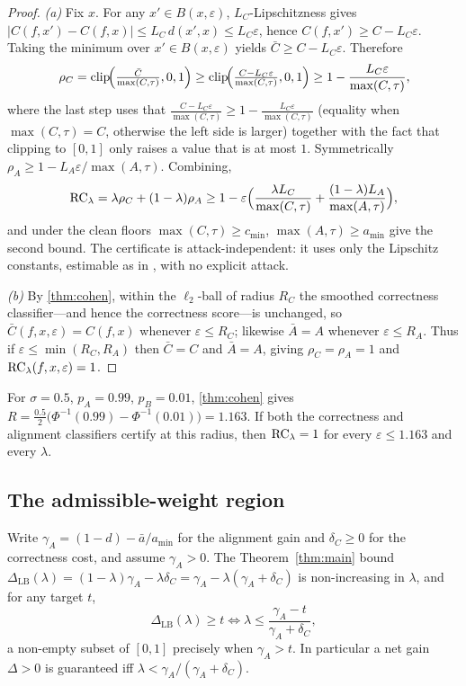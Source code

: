 \begin{proof}
\emph{(a)} Fix $x$. For any $x'\in B(x,\varepsilon)$, $L_C$-Lipschitzness gives
$|C(f,x')-C(f,x)|\le L_C\,d(x',x)\le L_C\varepsilon$, hence $C(f,x')\ge C-L_C
\varepsilon$. Taking the minimum over $x'\in B(x,\varepsilon)$ yields
$\bar C\ge C-L_C\varepsilon$. Therefore
\[
  \rho_C=\mathrm{clip}\!\Big(\tfrac{\bar C}{\max(C,\tau)},0,1\Big)
    \ge\mathrm{clip}\!\Big(\tfrac{C-L_C\varepsilon}{\max(C,\tau)},0,1\Big)
    \ge 1-\frac{L_C\varepsilon}{\max(C,\tau)},
\]
where the last step uses that $\frac{C-L_C\varepsilon}{\max(C,\tau)}\ge
1-\frac{L_C\varepsilon}{\max(C,\tau)}$ (equality when $\max(C,\tau)=C$, otherwise
the left side is larger) together with the fact that clipping to $[0,1]$ only raises
a value that is at most $1$. Symmetrically $\rho_A\ge1-L_A\varepsilon/\max(A,\tau)$.
Combining,
\[
  \mathrm{RC}_\lambda=\lambda\rho_C+(1-\lambda)\rho_A
    \ge 1-\varepsilon\Big(\frac{\lambda L_C}{\max(C,\tau)}
      +\frac{(1-\lambda)L_A}{\max(A,\tau)}\Big),
\]
and under the clean floors $\max(C,\tau)\ge c_{\min}$, $\max(A,\tau)\ge a_{\min}$
give the second bound. The certificate is attack-independent: it uses only the
Lipschitz constants, estimable as in \cite{Weng2018}, with no explicit attack.

\emph{(b)} By \cref{thm:cohen}, within the $\ell_2$-ball of radius $R_C$ the
smoothed correctness classifier---and hence the correctness score---is unchanged, so
$\bar C(f,x,\varepsilon)=C(f,x)$ whenever $\varepsilon\le R_C$; likewise
$\bar A=A$ whenever $\varepsilon\le R_A$. Thus if $\varepsilon\le\min(R_C,R_A)$ then
$\bar C=C$ and $\bar A=A$, giving $\rho_C=\rho_A=1$ and
$\mathrm{RC}_\lambda(f,x,\varepsilon)=1$.
\end{proof}

\begin{example}\label{ex:cohen}
For $\sigma=0.5$, $p_A=0.99$, $p_B=0.01$, \cref{thm:cohen} gives
$R=\tfrac{0.5}{2}\big(\Phi^{-1}(0.99)-\Phi^{-1}(0.01)\big)=1.163$. If both the
correctness and alignment classifiers certify at this radius, then $\mathrm{RC}_\lambda=1$
for every $\varepsilon\le1.163$ and every $\lambda$.
\end{example}

\subsection{The admissible-weight region}

\begin{theorem}\label{thm:lambda}
Write $\gamma_A=(1-d)-\bar a/a_{\min}$ for the alignment gain and $\delta_C\ge0$ for
the correctness cost, and assume $\gamma_A>0$. The Theorem~\ref{thm:main} bound
$\Delta_{\mathrm{LB}}(\lambda)=(1-\lambda)\gamma_A-\lambda\delta_C
=\gamma_A-\lambda(\gamma_A+\delta_C)$ is non-increasing in $\lambda$, and for any
target $t$,
\[
  \Delta_{\mathrm{LB}}(\lambda)\ge t
  \iff \lambda\le\frac{\gamma_A-t}{\gamma_A+\delta_C},
\]
a non-empty subset of $[0,1]$ precisely when $\gamma_A>t$. In particular a net gain
$\Delta>0$ is guaranteed iff $\lambda<\gamma_A/(\gamma_A+\delta_C)$.
\end{theorem}

